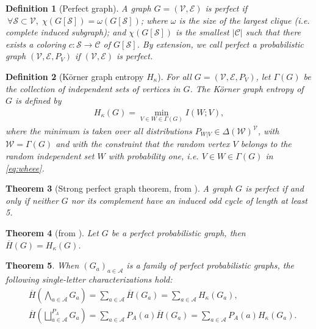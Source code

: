 \documentclass[conference,a4paper]{IEEEtran}
\newtheorem{theorem}{Theorem}[section]
\newtheorem{definition}[theorem]{Definition}
\begin{document}
\begin{definition}[Perfect graph]
    A graph $G = (\mathcal{V}, \mathcal{E})$ is perfect if $\:\forall \mathcal{S} \subset \mathcal{V}, \; \chi(G[\mathcal{S}]) = \omega(G[\mathcal{S}])$; where $\omega$ is the size of the largest clique (i.e. complete induced subgraph); and $\chi(G[\mathcal{S}])$ is the smallest $|\mathcal{C}|$ such that there exists a coloring $c : \mathcal{S} \rightarrow \mathcal{C}$ of $G[\mathcal{S}]$. By extension, we call perfect a probabilistic graph $(\mathcal{V}, \mathcal{E}, P_{V})$ if $(\mathcal{V}, \mathcal{E})$ is perfect.
\end{definition}

\begin{definition}[Körner graph entropy $H_\kappa$]
For all $G = (\mathcal{V}, \mathcal{E}, P_V)$, let $\Gamma(G)$ be the collection of independent sets of vertices in $G$. The K\"{o}rner graph entropy of $G$ is defined by
\begin{align}
    H_\kappa(G) = \min_{V \in W \in \Gamma(G)} I(W;V), \label{eq:wheee}
\end{align}
where the minimum is taken over all distributions $P_{W|V} \in \Delta(\mathcal{W})^{\mathcal{V}}$, with $\mathcal{W} = \Gamma(G)$ and with the constraint that the random vertex $V$ belongs to the random independent set $W$ with probability one, i.e. $V \in W \in \Gamma(G)$ in \eqref{eq:wheee}.
\end{definition}

\begin{theorem}[Strong perfect graph theorem, from \cite{chudnovsky2006strong}]\label{th:strongperfect}
A graph $G$ is perfect if and only if neither $G$ nor its complement have an induced odd cycle of length at least 5.
\end{theorem}

\begin{theorem}[from \cite{csiszar1990entropy}]\label{th:Hbarperfect}
    Let $G$ be a perfect probabilistic graph, then $\overline{H}(G) = H_\kappa(G)$.
\end{theorem}


\begin{theorem}\label{th:mainperfect}
    When $(G_a)_{a \in \mathcal{A}}$ is a family of perfect probabilistic graphs, the following single-letter characterizations hold:
    \begin{align}
        & \overline{H}\left(\bigwedge_{a \in \mathcal{A}} G_a \right) = \sum_{a \in \mathcal{A}} \overline{H}(G_a) = \sum_{a \in \mathcal{A}} H_\kappa(G_a), \\
        &  \overline{H}\left(\bigsqcup_{a \in \mathcal{A}}^{P_A} G_a \right) = \sum_{a \in \mathcal{A}} P_A(a) \overline{H}(G_a) = \sum_{a \in \mathcal{A}} P_A(a) H_\kappa(G_a).
    \end{align}
\end{theorem}
\end{document}
